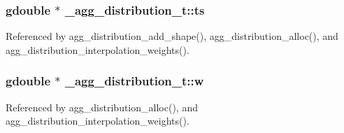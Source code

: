 \subsubsection[{ts}]{\setlength{\rightskip}{0pt plus 5cm}gdouble $\ast$ \+\_\+agg\+\_\+distribution\+\_\+t\+::ts}\label{struct__agg__distribution__t_a3cd1bc92425557d3dabc54a540f4fa64}


Referenced by agg\+\_\+distribution\+\_\+add\+\_\+shape(), agg\+\_\+distribution\+\_\+alloc(), and agg\+\_\+distribution\+\_\+interpolation\+\_\+weights().

\subsubsection[{w}]{\setlength{\rightskip}{0pt plus 5cm}gdouble $\ast$ \+\_\+agg\+\_\+distribution\+\_\+t\+::w}\label{struct__agg__distribution__t_aa19de11033888429461a8f71a41da6e0}


Referenced by agg\+\_\+distribution\+\_\+alloc(), and agg\+\_\+distribution\+\_\+interpolation\+\_\+weights().

